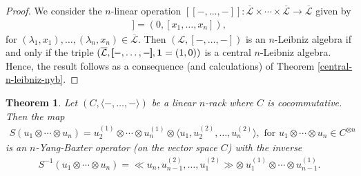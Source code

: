 \documentclass[a4paper,reqno,10pt]{amsart}
\theoremstyle{plain}
\newtheorem{thm}{Theorem}[section]
\theoremstyle{definition}
\theoremstyle{remark}
\begin{document}
\begin{proof}
    We consider the $n$-linear operation $[ \! \! [ -, \ldots, - ] \! \! ] : \overline{\mathcal{L}} \times \cdots \times \overline{\mathcal{L}} \rightarrow \overline{\mathcal{L}}$ given by 
    \begin{align*}
      [ \! \! [ (\lambda_1, x_1), \ldots, (\lambda_n, x_n) ] \! \! ] = (0, [x_1, \ldots, x_n]),  
    \end{align*}
    for $(\lambda_1, x_1), \ldots, (\lambda_n, x_n) \in \overline{\mathcal{L}}$. Then $(\mathcal{L}, [-, \ldots, - ])$ is an $n$-Leibniz algebra if and only if the triple $(\overline{\mathcal{L}}, [ \! \! [ -, \ldots, - ] \! \! ], {\bf 1} = (1, 0))$ is a central $n$-Leibniz algebra. Hence, the result follows as a consequence (and calculations) of Theorem \ref{central-n-leibniz-nyb}.
\end{proof}

\begin{thm}
    Let $(C, \langle -, \ldots, - \rangle)$ be a linear $n$-rack where $C$ is cocommutative. Then the map 
    \begin{align*}
    S (u_1 \otimes \cdots \otimes u_n) = u_2^{(1)} \otimes \cdots \otimes u_n^{(1)} \otimes \langle u_1, u_2^{(2)}, \ldots, u_n^{(2)} \rangle, \text{ for } u_1 \otimes \cdots \otimes u_n \in C^{\otimes n}
    \end{align*}
    is an $n$-Yang-Baxter operator (on the vector space $C$) with the inverse
    \begin{align}\label{inv-nybe}
       S^{-1} (u_1 \otimes \cdots \otimes u_n) = \ll u_n, u_{n-1}^{(2)}, \ldots, u_1^{(2)}  \gg \otimes ~ \! u_1^{(1)} \otimes \cdots \otimes u_{n-1}^{(1)}.
    \end{align}
\end{thm}
\end{document}

